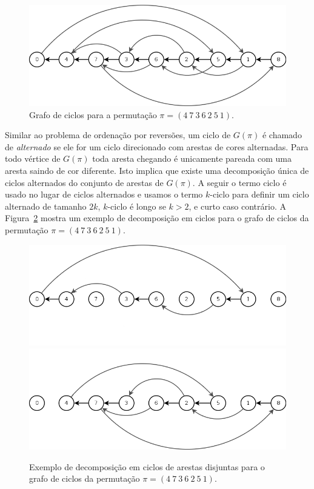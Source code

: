 \begin{figure}[h]
  \centering 
  \includegraphics[scale=0.6]{images/trans_cycle_graph.png} 
  \caption{Grafo de ciclos para a permutação $\pi = (4~7~3~6~2~5~1)$.}
  \label{fig:trans_cycle_graph}
\end{figure}

Similar ao problema de ordenação por reversões, um ciclo de $G(\pi)$ é
chamado de \textit{alternado} se ele for um ciclo direcionado com
arestas de cores alternadas. Para todo vértice de $G(\pi)$ toda aresta
chegando é unicamente pareada com uma aresta saindo de cor
diferente. Isto implica que existe uma decomposição única de ciclos
alternados do conjunto de arestas de $G(\pi)$. A seguir o termo ciclo
é usado no lugar de ciclos alternados e usamos o termo $k$-ciclo para
definir um ciclo alternado de tamanho $2k$, $k$-ciclo é longo se $k >
2$, e curto caso contrário. A Figura~\ref{fig:tra_grafo_bkp_dec}
mostra um exemplo de decomposição em ciclos para o grafo de ciclos da
permutação $\pi = (4~7~3~6~2~5~1)$.


\begin{figure}[h]
  \centering 
  \includegraphics[scale=0.6]{images/trans_cycle_graph_dec-1.png}
  \includegraphics[scale=0.6]{images/trans_cycle_graph_dec-2.png} 
  \caption{Exemplo de decomposição em ciclos de arestas disjuntas para
  o grafo de ciclos da permutação $\pi = (4~7~3~6~2~5~1)$.}
  \label{fig:tra_grafo_bkp_dec}
\end{figure}

